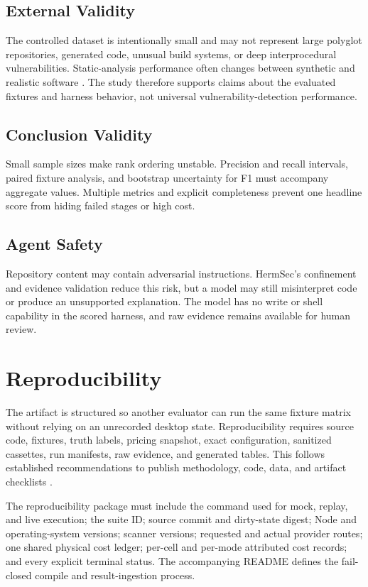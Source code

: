 \documentclass[sigconf,nonacm]{acmart}
\begin{document}
\subsection{External Validity}
The controlled dataset is intentionally small and may not represent large polyglot repositories, generated code, unusual build systems, or deep interprocedural vulnerabilities. Static-analysis performance often changes between synthetic and realistic software \cite{goseva2015capability}. The study therefore supports claims about the evaluated fixtures and harness behavior, not universal vulnerability-detection performance.

\subsection{Conclusion Validity}
Small sample sizes make rank ordering unstable. Precision and recall intervals, paired fixture analysis, and bootstrap uncertainty for F1 must accompany aggregate values. Multiple metrics and explicit completeness prevent one headline score from hiding failed stages or high cost.

\subsection{Agent Safety}
Repository content may contain adversarial instructions. HermSec's confinement and evidence validation reduce this risk, but a model may still misinterpret code or produce an unsupported explanation. The model has no write or shell capability in the scored harness, and raw evidence remains available for human review.

\section{Reproducibility}
The artifact is structured so another evaluator can run the same fixture matrix without relying on an unrecorded desktop state. Reproducibility requires source code, fixtures, truth labels, pricing snapshot, exact configuration, sanitized cassettes, run manifests, raw evidence, and generated tables. This follows established recommendations to publish methodology, code, data, and artifact checklists \cite{pineau2021reproducibility}.

The reproducibility package must include the command used for mock, replay, and live execution; the suite ID; source commit and dirty-state digest; Node and operating-system versions; scanner versions; requested and actual provider routes; one shared physical cost ledger; per-cell and per-mode attributed cost records; and every explicit terminal status. The accompanying README defines the fail-closed compile and result-ingestion process.
\end{document}
